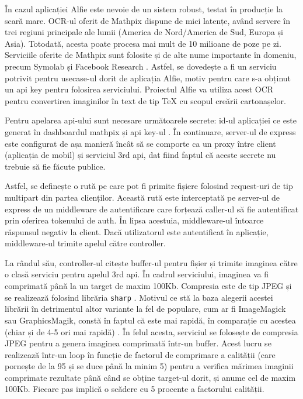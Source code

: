 În cazul aplicației Alfie este nevoie de un sistem robust, testat în producție la scară mare. OCR-ul oferit de Mathpix dispune de mici latențe, având servere în trei regiuni principale ale lumii (America de Nord/America de Sud, Europa și Asia). Totodată, acesta poate procesa mai mult de 10 milioane de poze pe zi. Serviciile oferite de Mathpix sunt folosite și de alte nume importante în domeniu, precum Symolab și Facebook Research \cite{mathpixOCR}. Astfel, se dovedește a fi un serviciu potrivit pentru usecase-ul dorit de aplicația Alfie, motiv pentru care s-a obținut un api key pentru folosirea serviciului. Proiectul Alfie va utiliza acest OCR pentru convertirea imaginilor în text de tip TeX cu scopul creării cartonașelor.

Pentru apelarea api-ului sunt necesare următoarele secrete: id-ul aplicației ce este generat în dashboardul mathpix și api key-ul \cite{mathpixApiReqParam}. În continuare, server-ul de express este configurat de așa manieră încât să se comporte ca un proxy între client (aplicația de mobil) și serviciul 3rd api, dat fiind faptul că aceste secrete nu trebuie să fie făcute publice.

Astfel, se definește o rută pe care pot fi primite fișiere folosind request-uri de tip multipart din partea clienților. Această rută este interceptată pe server-ul de express de un middleware de autentificare care forțează caller-ul să fie autentificat prin oferirea tokenului de auth. În lipsa acestuia, middleware-ul întoarce răspunsul negativ la client. Dacă utilizatorul este autentificat în aplicație, middleware-ul trimite apelul către controller.

La rândul său, controller-ul citește buffer-ul pentru fișier și trimite imaginea către o clasă serviciu pentru apelul 3rd api. În cadrul serviciului, imaginea va fi comprimată până la un target de maxim 100Kb. Compresia este de tip JPEG și se realizează folosind librăria \texttt{sharp} \cite{sharpImageCompression}. Motivul ce stă la baza alegerii acestei librării în detrimentul altor variante la fel de populare, cum ar fi ImageMagick sau GraphicsMagik, constă în faptul că este mai rapidă, în comparație cu acestea (chiar și de 4-5 ori mai rapidă) \cite{sharpImageCompression}. În felul acesta, serviciul se folosește de compresia JPEG pentru a genera imaginea comprimată într-un buffer. Acest lucru se realizează într-un loop în funcție de factorul de comprimare a calității (care pornește de la 95 și se duce până la minim 5) pentru a verifica mărimea imaginii comprimate rezultate până când se obține target-ul dorit, și anume cel de maxim 100Kb. Fiecare pas implică o scădere cu 5 procente a factorului calității.

